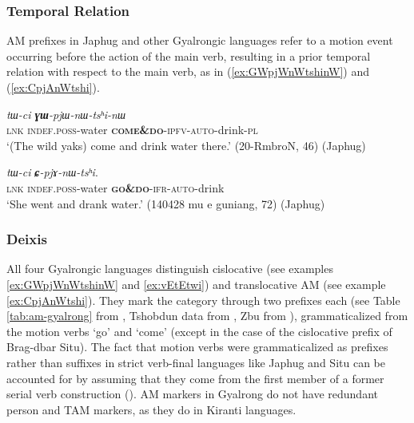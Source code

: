 \documentclass[oneside,a4paper,11pt]{article}
\newcommand{\ipa}[1]{{\phon\textit{#1}}}
\newcommand{\sens}[1]{‘#1’}
\newcommand{\rouge}[1]{\textbf{#1}}
\begin{document}
 \subsubsection{Temporal Relation}
AM prefixes in Japhug and other Gyalrongic languages refer to a motion event occurring before the action of the main verb, resulting in a prior temporal relation with respect to the main verb, as in  (\ref{ex:GWpjWnWtshinW}) and (\ref{ex:CpjAnWtshi}).

\begin{exe}
\ex \label{ex:GWpjWnWtshinW}
\gll \ipa{tɕe}	\ipa{tɯ-ci}	\ipa{\rouge{ɣɯ}-pjɯ-nɯ-tsʰi-nɯ} \\
\textsc{lnk} \textsc{indef}.\textsc{poss}-water \rouge{\textsc{come\&do}}-\textsc{ipfv}-\textsc{auto}-drink-\textsc{pl} \\
\glt \sens{(The wild yaks) come and drink water there.} (20-RmbroN, 46) (Japhug)
\end{exe}

\begin{exe}
\ex \label{ex:CpjAnWtshi}
\gll \ipa{tɕe}	\ipa{tɯ-ci}	\ipa{\rouge{ɕ}-pjɤ-nɯ-tsʰi}. \\
\textsc{lnk} \textsc{indef}.\textsc{poss}-water \rouge{\textsc{go\&do}}-\textsc{ifr}-\textsc{auto}-drink  \\
\glt \sens{She went and drank water.} (140428 mu e guniang, 72) (Japhug)
\end{exe}

\subsubsection{Deixis}

All four Gyalrongic languages  distinguish cislocative (see examples \ref{ex:GWpjWnWtshinW} and \ref{ex:vEtEtwi}) and translocative AM (see example \ref{ex:CpjAnWtshi}).  They mark the category through two prefixes each (see Table \ref{tab:am-gyalrong} from \citealt[200]{zhang16bragdbar}, Tshobdun data from \citealt{sun12complementation}, Zbu from \citealt{gong18these}), grammaticalized from the motion verbs `go' and `come' (except in the case of the cislocative prefix of Brag-dbar Situ). The fact that motion verbs were grammaticalized as prefixes rather than suffixes in strict verb-final languages like Japhug and Situ can be accounted for by assuming that they come from the first member of a former serial verb construction (\citealt{jacques13harmonization}). AM markers in Gyalrong do not have redundant person and TAM markers, as they do in Kiranti languages. 
\end{document}
